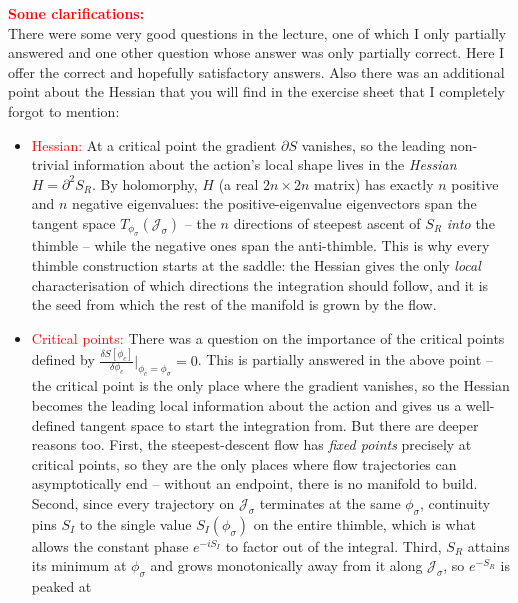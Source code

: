 \documentclass[11pt]{article}
\theoremstyle{definition}
\begin{document}
\noindent \textcolor{red}{\textbf{Some clarifications:}}\\
There were some very good questions in the lecture, one of which I only partially answered  and one other question whose answer was only partially correct. Here I offer the correct and hopefully satisfactory answers. Also there was an additional point about the Hessian that you will find in the exercise sheet that I completely forgot to mention:

\begin{itemize}
  \item \textcolor{red}{Hessian:} At a critical point the gradient $\partial S$ vanishes, so the leading non-trivial information about the action's local shape lives in the
\emph{Hessian} $H = \partial^2 S_R$. By holomorphy, $H$ (a real
$2n\times2n$ matrix) has exactly $n$ positive and $n$ negative eigenvalues:
the positive-eigenvalue eigenvectors span the tangent space
$T_{\phi_\sigma}(\mathcal{J}_\sigma)$ -- the $n$ directions of steepest
ascent of $S_R$ \emph{into} the thimble -- while the negative ones span
the anti-thimble. This is why every thimble construction starts at the
saddle: the Hessian gives the only \emph{local} characterisation of which
directions the integration should follow, and it is the seed from which
the rest of the manifold is grown by the flow.
  \item \textcolor{red}{Critical points: } There was a question on the
        importance of the critical points defined by
        $\frac{\delta S[\phi_c]}{\delta\phi_c}\Bigg|_{\phi_c=\phi_\sigma}
        = 0$. This is partially answered in the above point -- the critical
        point is the only place where the gradient vanishes, so the Hessian
        becomes the leading local information about the action and gives us
        a well-defined tangent space to start the integration from. But
        there are deeper reasons too. First, the steepest-descent flow has
        \emph{fixed points} precisely at critical points, so they are the
        only places where flow trajectories can asymptotically end --
        without an endpoint, there is no manifold to build. Second, since
        every trajectory on $\mathcal{J}_\sigma$ terminates at the same
        $\phi_\sigma$, continuity pins $S_I$ to the single value
        $S_I(\phi_\sigma)$ on the entire thimble, which is what allows the
        constant phase $e^{-iS_I}$ to factor out of the integral. Third,
        $S_R$ attains its minimum at $\phi_\sigma$ and grows monotonically
        away from it along $\mathcal{J}_\sigma$, so $e^{-S_R}$ is peaked at

\end{itemize}
\end{document}
